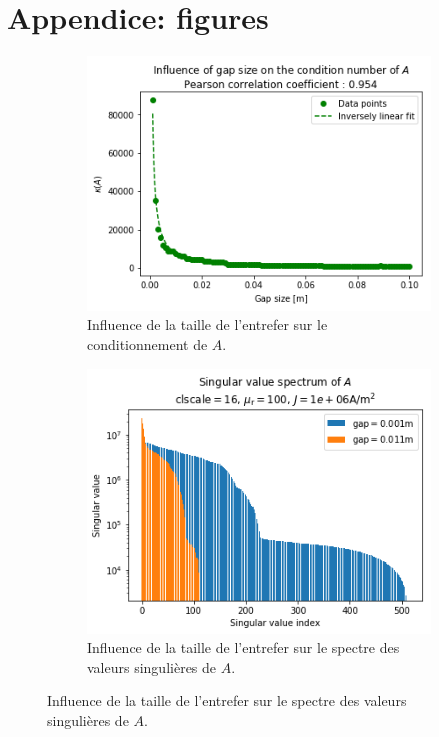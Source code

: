 \documentclass[11pt]{article}
\begin{document}
\section{Appendice: figures}
\begin{figure}[H]
	\centering
	\begin{subfigure}[t]{0.24\textwidth}
		\centering
		\includegraphics[width=\linewidth]{gapcond.png}
		\caption{Influence de la taille de l'entrefer sur le  conditionnement de $A$.}
		\label{fig:gapcond}
	\end{subfigure}\hfill
	\begin{subfigure}[t]{0.24\textwidth}
		\centering
		\includegraphics[width=\linewidth]{gapspec.png}
		\caption{Influence de la taille de l'entrefer sur le spectre des valeurs singulières de $A$.}

\end{subfigure}
\end{figure}
\end{document}
